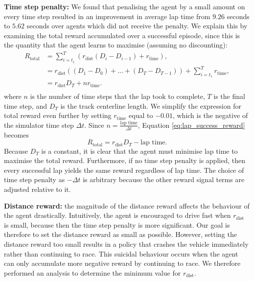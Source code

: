 \textbf{Time step penalty:}
We found that penalising the agent by a small amount on every time step resulted in an improvement in average lap time from $9.26$ seconds to $5.62$ seconds over agents which did not receive the penalty.
We explain this by examining the total reward accumulated over a successful episode, since this is the quantity that the agent learns to maximise (assuming no discounting):
\begin{equation}
    \begin{split}
        R_{\text{total}} &=  \sum_{i=t_1}^{T} \left( r_{\text{dist}}(D_{i}-D_{i-1})+r_{\text{time}} \right), \\
        &= r_{\text{dist}} \left( (D_1-D_0) + \ldots + (D_{T} - D_{T-1}) \right) + \sum_{i=t_1}^{T} r_{\text{time}}, \\
        &= r_{\text{dist}} D_T  + n r_{\text{time}}. \\
    \end{split}
\label{eq:lap_success_reward}
\end{equation}
where $n$ is the number of time steps that the lap took to complete, $T$ is the final time step, and $D_T$ is the track centerline length.
We simplify the expression for total reward even further by setting $r_{\text{time}}$ equal to $-0.01$, which is the negative of the simulator time step $\Delta t$.
Since  $n=\frac{\text{lap time}}{\Delta t}$, Equation \ref{eq:lap_success_reward} becomes
\begin{equation}
    R_{\text{total}} = r_{\text{dist}} D_T - \text{lap time}.
\end{equation}
Because $D_T$ is a constant, it is clear that the agent must minimise lap time to maximise the total reward.
Furthermore, if no time step penalty is applied, then every successful lap yields the same reward regardless of lap time.
The choice of time step penalty as $-\Delta t$ is arbitrary because the other reward signal terms are adjusted relative to it.

%     

\textbf{Distance reward:}
the magnitude of the distance reward affects the behaviour of the agent drastically.
Intuitively, the agent is encouraged to drive fast when $r_{\text{dist}}$ is small, because then the time step penalty is more significant.
Our goal is therefore to set the distance reward as small as possible.
However, setting the distance reward too small results in a policy that crashes the vehicle immediately rather than continuing to race.
This suicidal behaviour occurs when the agent can only accumulate more negative reward by continuing to race.
We therefore performed an analysis to determine the minimum value for $r_{\text{dist}}$.

